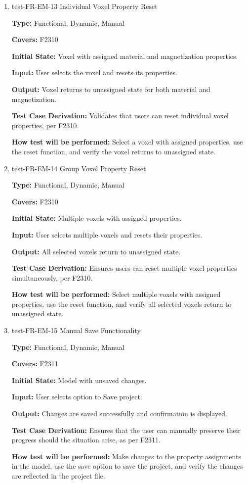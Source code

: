 \documentclass[12pt, titlepage]{article}
\begin{document}
\begin{enumerate}
\item{test-FR-EM-13 Individual Voxel Property Reset\\}
\label{sec:t-em-13}

\textbf{Type:} Functional, Dynamic, Manual

\textbf{Covers:} F2310
					
\textbf{Initial State:} Voxel with assigned material and magnetization properties.
					
\textbf{Input:} User selects the voxel and resets its properties.
					
\textbf{Output:} Voxel returns to unassigned state for both material and magnetization.

\textbf{Test Case Derivation:} Validates that users can reset individual voxel properties, per F2310.
					
\textbf{How test will be performed:} Select a voxel with assigned properties, use the reset function, and verify the voxel returns to unassigned state.

\item{test-FR-EM-14 Group Voxel Property Reset\\}
\label{sec:t-em-14}

\textbf{Type:} Functional, Dynamic, Manual

\textbf{Covers:} F2310
					
\textbf{Initial State:} Multiple voxels with assigned properties.
					
\textbf{Input:} User selects multiple voxels and resets their properties.
					
\textbf{Output:} All selected voxels return to unassigned state.

\textbf{Test Case Derivation:} Ensures users can reset multiple voxel properties simultaneously, per F2310.
					
\textbf{How test will be performed:} Select multiple voxels with assigned properties, use the reset function, and verify all selected voxels return to unassigned state.

\item{test-FR-EM-15 Manual Save Functionality\\}
\label{sec:t-em-15}

\textbf{Type:} Functional, Dynamic, Manual

\textbf{Covers:} F2311

\textbf{Initial State:} Model with unsaved changes.

\textbf{Input:} User selects option to Save project.

\textbf{Output:} Changes are saved successfully and confirmation is displayed.

\textbf{Test Case Derivation:} Ensures that the user can manually preserve their progress should the situation arise, as per F2311.

\textbf{How test will be performed:} Make changes to the property assignments in the model, use the save option to save the project, and verify the changes are reflected in the project file.

\end{enumerate}
\end{document}
